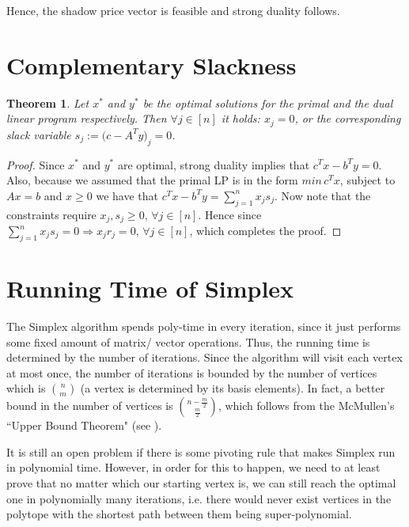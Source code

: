 \documentclass[11pt]{article}
\newtheorem{theorem}{Theorem}
\begin{document}
Hence, the shadow price vector is feasible and strong duality follows.



\section{Complementary Slackness}

\begin{theorem}
Let $x^{*}$ and $y^{*}$ be the optimal solutions for the primal and the dual linear program respectively. Then $\forall j \in [n]$ it holds: $x_j = 0$, or the corresponding slack variable $s_j := \big(c - A^Ty\big)_j = 0$.
\end{theorem}

\begin{proof}
Since  $x^{*}$ and $y^{*}$ are optimal, strong duality implies that $c^Tx - b^Ty = 0$. Also, because we assumed that the primal LP is in the form $min\, c^Tx$, subject to $Ax = b$ and $x \geq 0$ we have that  $c^Tx - b^Ty = \sum_{j =1}^n x_j s_j$. Now note that the constraints require $x_j, s_j \geq 0, \, \forall j \in [n]$. Hence since $\sum_{j =1}^n x_j s_j = 0 \Rightarrow x_jr_j = 0,\, \forall j \in [n]$, which completes the proof.
\end{proof}

\section{Running Time of Simplex}

The Simplex algorithm spends poly-time in every iteration, since it just performs some fixed amount of matrix/ vector operations. Thus, the running time is determined by the number of iterations. Since the algorithm will visit each vertex at most once, the number of iterations is bounded by the number of vertices which is $\binom{n}{m}$ (a vertex is determined by its basis elements). In fact, a better bound in the number of vertices is $\binom{n - \frac{m}{2}}{\frac{m}{2}}$, which follows from the McMullen's ``Upper Bound Theorem" (see \cite{McMullen71}).

It is still an open problem if there is some pivoting rule that makes Simplex run in polynomial time. However, in order for this to happen, we need to at least prove that no matter which our starting vertex is, we can still reach the optimal one in polynomially many iterations, i.e. there would never exist vertices in the polytope with the shortest path between them being super-polynomial.
\end{document}
